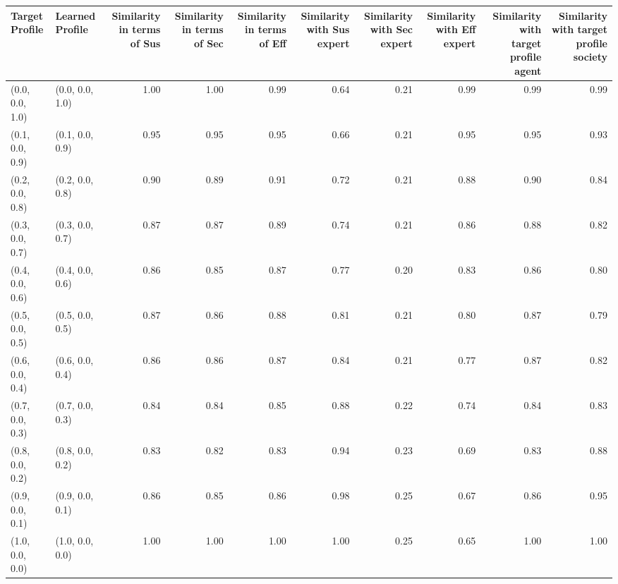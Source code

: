 \begin{tabular}{llrrrrrrrr}
\toprule
Target Profile & Learned Profile & Similarity in terms of Sus & Similarity in terms of Sec & Similarity in terms of Eff & Similarity with Sus expert & Similarity with Sec expert & Similarity with Eff expert & Similarity with target profile agent & Similarity with target profile society \\
\midrule
(0.0, 0.0, 1.0) & (0.0, 0.0, 1.0) & 1.00 & 1.00 & 0.99 & 0.64 & 0.21 & 0.99 & 0.99 & 0.99 \\
(0.1, 0.0, 0.9) & (0.1, 0.0, 0.9) & 0.95 & 0.95 & 0.95 & 0.66 & 0.21 & 0.95 & 0.95 & 0.93 \\
(0.2, 0.0, 0.8) & (0.2, 0.0, 0.8) & 0.90 & 0.89 & 0.91 & 0.72 & 0.21 & 0.88 & 0.90 & 0.84 \\
(0.3, 0.0, 0.7) & (0.3, 0.0, 0.7) & 0.87 & 0.87 & 0.89 & 0.74 & 0.21 & 0.86 & 0.88 & 0.82 \\
(0.4, 0.0, 0.6) & (0.4, 0.0, 0.6) & 0.86 & 0.85 & 0.87 & 0.77 & 0.20 & 0.83 & 0.86 & 0.80 \\
(0.5, 0.0, 0.5) & (0.5, 0.0, 0.5) & 0.87 & 0.86 & 0.88 & 0.81 & 0.21 & 0.80 & 0.87 & 0.79 \\
(0.6, 0.0, 0.4) & (0.6, 0.0, 0.4) & 0.86 & 0.86 & 0.87 & 0.84 & 0.21 & 0.77 & 0.87 & 0.82 \\
(0.7, 0.0, 0.3) & (0.7, 0.0, 0.3) & 0.84 & 0.84 & 0.85 & 0.88 & 0.22 & 0.74 & 0.84 & 0.83 \\
(0.8, 0.0, 0.2) & (0.8, 0.0, 0.2) & 0.83 & 0.82 & 0.83 & 0.94 & 0.23 & 0.69 & 0.83 & 0.88 \\
(0.9, 0.0, 0.1) & (0.9, 0.0, 0.1) & 0.86 & 0.85 & 0.86 & 0.98 & 0.25 & 0.67 & 0.86 & 0.95 \\
(1.0, 0.0, 0.0) & (1.0, 0.0, 0.0) & 1.00 & 1.00 & 1.00 & 1.00 & 0.25 & 0.65 & 1.00 & 1.00 \\
\bottomrule
\end{tabular}
